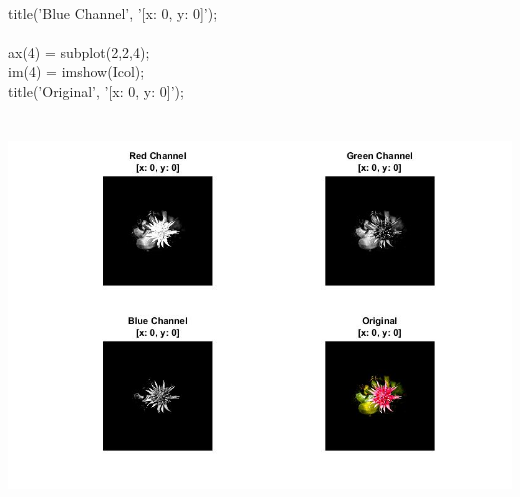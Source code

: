         \\ title({'Blue Channel', '[x: 0, y: 0]'});
        \\
        \\ ax(4) = subplot(2,2,4);
        \\ im(4) = imshow(Icol);
        \\ title({'Original', '[x: 0, y: 0]'});
        \\\\\
        \includegraphics[scale=0.58]{images/SolutionSecPart.jpg} 
        \\\\
    
